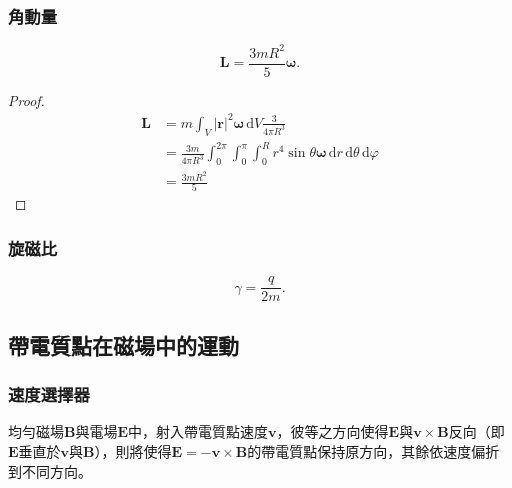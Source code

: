 \documentclass[a4paper,12pt]{report}
\begin{document}
\begin{itemize}
\subsubsection{角動量}
\[\mathbf{L}=\frac{3mR^2}{5}\boldsymbol{\omega}.\]
\begin{proof}
\[\begin{aligned}
\mathbf{L}&=m\int_V|\mathbf{r}|^2\boldsymbol{\omega}\,\mathrm{d}V\frac{3}{4\pi R^3}\\
&=\frac{3m}{4\pi R^3}\int_0^{2\pi}\int_0^{\pi}\int_0^Rr^4\sin\theta\boldsymbol{\omega}\,\mathrm{d}r\,\mathrm{d}\theta\,\mathrm{d}\varphi\\
&=\frac{3mR^2}{5}
\end{aligned}\]
\end{proof}
\subsubsection{旋磁比}
\[\gamma=\frac{q}{2m}.\]
\subsection{帶電質點在磁場中的運動}
\subsubsection{速度選擇器}
均勻磁場$\mathbf{B}$與電場$\mathbf{E}$中，射入帶電質點速度$\mathbf{v}$，彼等之方向使得$\mathbf{E}$與$\mathbf{v}\times\mathbf{B}$反向（即$\mathbf{E}$垂直於$\mathbf{v}$與$\mathbf{B}$），則將使得$\mathbf{E}=-\mathbf{v}\times\mathbf{B}$的帶電質點保持原方向，其餘依速度偏折到不同方向。

\end{itemize}
\end{document}
